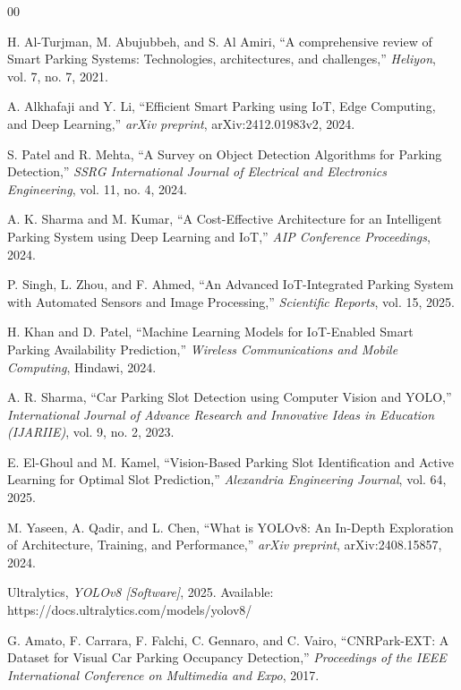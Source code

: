 \documentclass[conference]{IEEEtran}
\begin{document}
\begin{thebibliography}{00}

H. Al-Turjman, M. Abujubbeh, and S. Al Amiri, 
``A comprehensive review of Smart Parking Systems: Technologies, architectures, and challenges,'' 
\textit{Heliyon}, vol. 7, no. 7, 2021. 

A. Alkhafaji and Y. Li, 
``Efficient Smart Parking using IoT, Edge Computing, and Deep Learning,'' 
\textit{arXiv preprint}, arXiv:2412.01983v2, 2024. 

S. Patel and R. Mehta, 
``A Survey on Object Detection Algorithms for Parking Detection,'' 
\textit{SSRG International Journal of Electrical and Electronics Engineering}, 
vol. 11, no. 4, 2024. 

A. K. Sharma and M. Kumar, 
``A Cost-Effective Architecture for an Intelligent Parking System using Deep Learning and IoT,'' 
\textit{AIP Conference Proceedings}, 2024. 

P. Singh, L. Zhou, and F. Ahmed, 
``An Advanced IoT-Integrated Parking System with Automated Sensors and Image Processing,'' 
\textit{Scientific Reports}, vol. 15, 2025. 

H. Khan and D. Patel, 
``Machine Learning Models for IoT-Enabled Smart Parking Availability Prediction,'' 
\textit{Wireless Communications and Mobile Computing}, Hindawi, 2024. 

A. R. Sharma, 
``Car Parking Slot Detection using Computer Vision and YOLO,'' 
\textit{International Journal of Advance Research and Innovative Ideas in Education (IJARIIE)}, 
vol. 9, no. 2, 2023. 

E. El-Ghoul and M. Kamel, 
``Vision-Based Parking Slot Identification and Active Learning for Optimal Slot Prediction,'' 
\textit{Alexandria Engineering Journal}, vol. 64, 2025. 

M. Yaseen, A. Qadir, and L. Chen, 
``What is YOLOv8: An In-Depth Exploration of Architecture, Training, and Performance,'' 
\textit{arXiv preprint}, arXiv:2408.15857, 2024.

Ultralytics, 
\textit{YOLOv8 [Software]}, 2025. 
Available: https://docs.ultralytics.com/models/yolov8/

G. Amato, F. Carrara, F. Falchi, C. Gennaro, and C. Vairo, 
``CNRPark-EXT: A Dataset for Visual Car Parking Occupancy Detection,'' 
\textit{Proceedings of the IEEE International Conference on Multimedia and Expo}, 2017.


\end{thebibliography}
\end{document}
